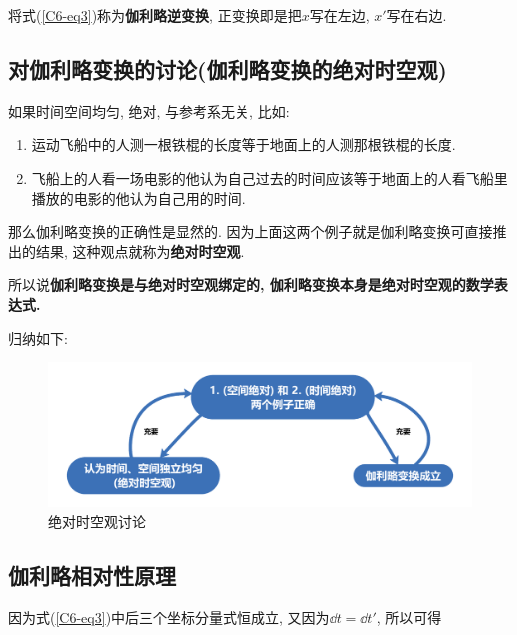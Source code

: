 将式(\ref{C6-eq3})称为\textbf{伽利略逆变换}, 正变换即是把$x$写在左边, $x'$写在右边. 



\subsection{对伽利略变换的讨论(伽利略变换的绝对时空观)}

如果时间空间均匀, 绝对, 与参考系无关, 比如: 

\vskip 0.3cm

\begin{enumerate}
	
	\item 运动飞船中的人测一根铁棍的长度等于地面上的人测那根铁棍的长度.
	
	\item 飞船上的人看一场电影的他认为自己过去的时间应该等于地面上的人看飞船里播放的电影的他认为自己用的时间. 
	
\end{enumerate}

\vskip 0.3cm

那么伽利略变换的正确性是显然的. 因为上面这两个例子就是伽利略变换可直接推出的结果, 这种观点就称为\textbf{绝对时空观}. 

所以说\textbf{伽利略变换是与绝对时空观绑定的, 伽利略变换本身是绝对时空观的数学表达式. }

\vskip 0.3cm

归纳如下: 

\begin{figure}[htbp]
	\centering
	\includegraphics[scale=0.5]{C6-fig2.pdf}
	\caption{绝对时空观讨论}
	\label{C6-fig2}
\end{figure}

\subsection{伽利略相对性原理}

因为式(\ref{C6-eq3})中后三个坐标分量式恒成立, 又因为$\dd{t} = \dd{t'}$, 所以可得

